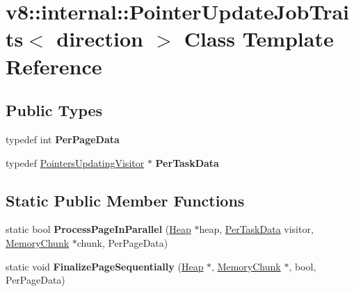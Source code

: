 \hypertarget{classv8_1_1internal_1_1_pointer_update_job_traits}{}\section{v8\+:\+:internal\+:\+:Pointer\+Update\+Job\+Traits$<$ direction $>$ Class Template Reference}
\label{classv8_1_1internal_1_1_pointer_update_job_traits}
\subsection*{Public Types}
\begin{DoxyCompactItemize}
\item 
typedef int {\bfseries Per\+Page\+Data}\hypertarget{classv8_1_1internal_1_1_pointer_update_job_traits_af5b9260e0d272da58ed39af6fbe250f4}{}\label{classv8_1_1internal_1_1_pointer_update_job_traits_af5b9260e0d272da58ed39af6fbe250f4}

\item 
typedef \hyperlink{classv8_1_1internal_1_1_pointers_updating_visitor}{Pointers\+Updating\+Visitor} $\ast$ {\bfseries Per\+Task\+Data}\hypertarget{classv8_1_1internal_1_1_pointer_update_job_traits_a08d5839921d828ce72ac83775bf136ad}{}\label{classv8_1_1internal_1_1_pointer_update_job_traits_a08d5839921d828ce72ac83775bf136ad}

\end{DoxyCompactItemize}
\subsection*{Static Public Member Functions}
\begin{DoxyCompactItemize}
\item 
static bool {\bfseries Process\+Page\+In\+Parallel} (\hyperlink{classv8_1_1internal_1_1_heap}{Heap} $\ast$heap, \hyperlink{classv8_1_1internal_1_1_pointers_updating_visitor}{Per\+Task\+Data} visitor, \hyperlink{classv8_1_1internal_1_1_memory_chunk}{Memory\+Chunk} $\ast$chunk, Per\+Page\+Data)\hypertarget{classv8_1_1internal_1_1_pointer_update_job_traits_a7a2e343faf95fecd6d3570cb7922afff}{}\label{classv8_1_1internal_1_1_pointer_update_job_traits_a7a2e343faf95fecd6d3570cb7922afff}

\item 
static void {\bfseries Finalize\+Page\+Sequentially} (\hyperlink{classv8_1_1internal_1_1_heap}{Heap} $\ast$, \hyperlink{classv8_1_1internal_1_1_memory_chunk}{Memory\+Chunk} $\ast$, bool, Per\+Page\+Data)\hypertarget{classv8_1_1internal_1_1_pointer_update_job_traits_a37146b285daa6457b7d5aafafe3d64b7}{}\label{classv8_1_1internal_1_1_pointer_update_job_traits_a37146b285daa6457b7d5aafafe3d64b7}

\end{DoxyCompactItemize}
